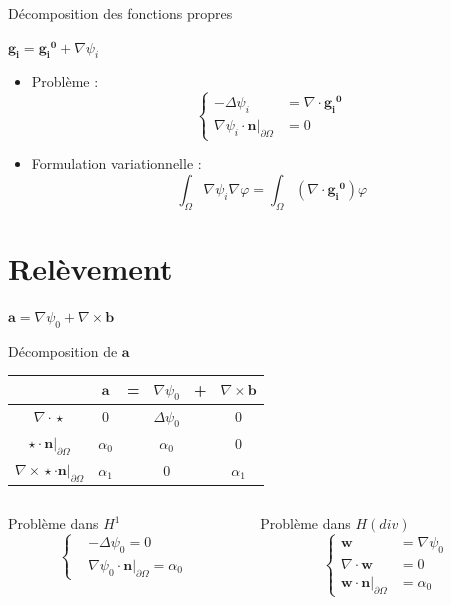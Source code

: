 \documentclass{beamer}
\newcommand{\grad}{{\nabla}}
\newcommand{\laplace}{{\Delta}}
\newcommand{\rot}{{\nabla\times}}
\renewcommand{\div}{{\nabla\cdot}}
\newcommand{\restr}{{\big\rvert_{\partial\Omega}}}
\begin{document}
\begin{frame}{Décomposition des fonctions propres}
\begin{block}{$\mathbf{g_i}=\mathbf{\mathbf{g_i}^0}+\grad\psi_i$}
\begin{itemize}
\item Problème :
\[
\left\{
\begin{aligned}
-\laplace\psi_i &= \div \mathbf{\mathbf{g_i}^0}\\
\grad\psi_i\cdot \mathbf{n}\restr &= 0
\end{aligned}
\right.
\]
\item Formulation variationnelle :
\[
\int_\Omega \grad\psi_i\grad\varphi = \int_\Omega (\div \mathbf{\mathbf{g_i}^0})\varphi
\]
\end{itemize}
\end{block}
\end{frame}



\section{Relèvement}
\begin{frame}{$\mathbf{a}=\grad\psi_0+\rot \mathbf{b}$}
\label{psi0}
\begin{block}{Décomposition de $\mathbf{a}$}
\begin{center}
\begin{tabular}{c|ccccc}
& $\mathbf{a}$ & = & $\grad\psi_0$ & + & $\rot \mathbf{b}$ \\ \hline
$\div\star$ & 0 & & $\laplace\psi_0$ & & 0\\ \hline
$\star\cdot \mathbf{n}\restr$ & $\alpha_0$ & & $\alpha_0$ & & 0\\ \hline
$\rot\star\cdot \mathbf{n}\restr$ & $\alpha_1$ & & 0 & & $\alpha_1$
\end{tabular}
\end{center}
\end{block}
\begin{columns}[t]
\begin{column}{5cm}
\begin{block}{Problème dans $ H^1$}
\[\left\{
\begin{aligned}
&-\laplace\psi_0 = 0\\
&\grad\psi_0\cdot \mathbf{n}\restr=\alpha_0
\end{aligned}
\right.\]
\end{block}
\end{column}
\begin{column}{5cm}
\begin{block}{Problème dans $ H(div)$}
\[\left\{
\begin{aligned}
\mathbf{w} &= \grad \psi_0\\
\div \mathbf{w} &= 0\\
\mathbf{w}\cdot \mathbf{n}\restr &= \alpha_0
\end{aligned}
\right.\]
\end{block}
\end{column}
\end{columns}
\end{frame}
\end{document}
